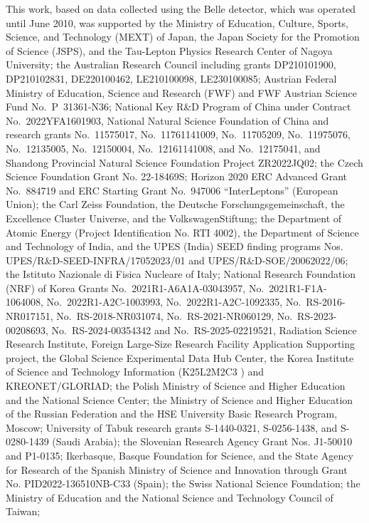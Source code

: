 This work, based on data collected using the Belle detector, which was
operated until June 2010, was supported by
the Ministry of Education, Culture, Sports, Science, and
Technology (MEXT) of Japan, the Japan Society for the
Promotion of Science (JSPS), and the Tau-Lepton Physics
Research Center of Nagoya University;
the Australian Research Council including grants
DP210101900,
DP210102831,
DE220100462,
LE210100098,
LE230100085;
Austrian Federal Ministry of Education, Science and Research (FWF) and
FWF Austrian Science Fund No.~P~31361-N36;
National Key R\&D Program of China under Contract No.~2022YFA1601903,
National Natural Science Foundation of China and research grants
No.~11575017,
No.~11761141009,
No.~11705209,
No.~11975076,
No.~12135005,
No.~12150004,
No.~12161141008,
and
No.~12175041,
and Shandong Provincial Natural Science Foundation Project ZR2022JQ02;
the Czech Science Foundation Grant No. 22-18469S;
Horizon 2020 ERC Advanced Grant No.~884719 and ERC Starting Grant No.~947006 ``InterLeptons'' (European Union);
the Carl Zeiss Foundation, the Deutsche Forschungsgemeinschaft, the
Excellence Cluster Universe, and the VolkswagenStiftung;
the Department of Atomic Energy (Project Identification No. RTI 4002), the Department of Science and Technology of India,
and the UPES (India) SEED finding programs Nos. UPES/R\&D-SEED-INFRA/17052023/01 and UPES/R\&D-SOE/20062022/06;
the Istituto Nazionale di Fisica Nucleare of Italy;
National Research Foundation (NRF) of Korea Grants
No.~2021R1-A6A1A-03043957,
No.~2021R1-F1A-1064008,
No.~2022R1-A2C-1003993,
No.~2022R1-A2C-1092335,
No.~RS-2016-NR017151,
No.~RS-2018-NR031074,
No.~RS-2021-NR060129,
No.~RS-2023-00208693,
No.~RS-2024-00354342
and
No.~RS-2025-02219521,
Radiation Science Research Institute,
Foreign Large-Size Research Facility Application Supporting project,
the Global Science Experimental Data Hub Center, the Korea Institute of Science and
Technology Information (K25L2M2C3 ) and KREONET/GLORIAD;
the Polish Ministry of Science and Higher Education and
the National Science Center;
the Ministry of Science and Higher Education of the Russian Federation
and the HSE University Basic Research Program, Moscow;
University of Tabuk research grants
S-1440-0321, S-0256-1438, and S-0280-1439 (Saudi Arabia);
the Slovenian Research Agency Grant Nos. J1-50010 and P1-0135;
Ikerbasque, Basque Foundation for Science, and the State Agency for Research
of the Spanish Ministry of Science and Innovation through Grant No. PID2022-136510NB-C33 (Spain);
the Swiss National Science Foundation;
the Ministry of Education and the National Science and Technology Council of Taiwan;
